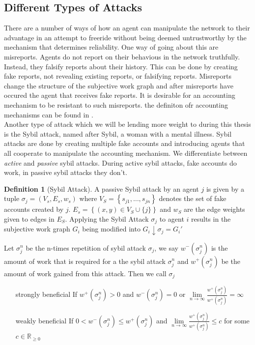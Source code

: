 \documentclass[11pt,a4paper]{report}
\theoremstyle{definition}
\newtheorem{definition}{Definition}[section]
\theoremstyle{theorem}
\theoremstyle{proposition}
\theoremstyle{corollary}
\theoremstyle{lemma}
\theoremstyle{example}
\theoremstyle{remark}
\begin{document}
\subsection{Different Types of Attacks}
\label{subsec:Different Types of Attacks}
There are a number of ways of how an agent can manipulate the network to their advantage in an attempt to freeride without being deemed untrustworthy by the mechanism that determines reliability. One way of going about this are misreports. Agents do not report on their behavious in the network truthfully. Instead, they falsify reports about their history. This can be done by creating fake reports, not revealing existing reports, or falsifying reports. Misreports change the structure of the subjective work graph and after misreports have occured the agent that receives fake reports. It is desirable for an accounting mechanism to be resistant to such misreports. the definiton ofr accounting mechanisms can be found in \cite{On the Sybil-Proofness of Accounting Mechanisms}. \vspace{1em}\\

\noindent Another type of attack which we will be lending more weight to during this thesis is the Sybil attack, named after Sybil, a woman with a mental illness. Sybil attacks are done by creating multiple fake accounts and introducing agents that all cooperate to manipulate the accounting mechanism. We differentiate between {\it active} and {\it passive} sybil attacks. During active sybil attacks, fake accounts do work, in passive sybil attacks they don't. 

\begin{definition}[Sybil Attack]
A passive Sybil attack by an agent $j$ is given by a tuple $\sigma_j=(V_s,E_s,w_s)$ where $V_S=\left\lbrace{}s_{j1},\ldots,s_{jn}\right\rbrace$ denotes the set of fake accounts created by $j$. $E_s=\left\lbrace{}(x,y)\in{}V_S\cup{}\{j\}\right\rbrace$ and $w_S$ are the edge weights given to edges in $E_S$. Applying the Sybil Attack $\sigma_j$ to agent $i$ results in the subjective work graph $G_i$ being modified into $G_i\downarrow{}\sigma_j=G_i'$
\end{definition}

Let $\sigma_j^n$ be the n-times repetition of sybil attack $\sigma_j$, we say $w^{-}(\sigma_j^n)$ is the amount of work that is required for a the sybil attack $\sigma_j^n$ and $w^{+}(\sigma_j^n)$ be the amount of work gained from this attack. Then we call $\sigma_j$ 
\begin{itemize}
\item[strongly beneficial] If $w^{+}(\sigma_j^n)>0$ and $w^{-}(\sigma_j^n)=0$ or $\lim\limits_{n\rightarrow\infty}\frac{w^{+}(\sigma_j^n)}{w^{+}(\sigma_j^n)}=\infty$
\item[weakly beneficial] If $0<w^{-}(\sigma_j^n)\leq{}w^{+}(\sigma_j^n)$ and $\lim\limits_{n\rightarrow\infty}\frac{w^{+}(\sigma_j^n)}{w^{+}(\sigma_j^n)}\leq{}c$ for some $c\in\mathbb{R}_{\geq{}0}$
\end{itemize}
\end{document}

